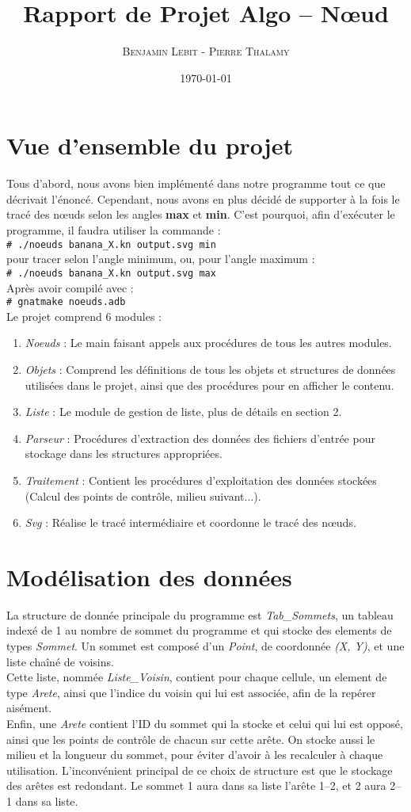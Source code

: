 \documentclass[12pt]{article}
\title{Rapport de Projet Algo -- Nœud}
\author{\textsc{Benjamin Lebit} - \textsc{Pierre Thalamy}}
\date{\today}
\newcommand{\shellcmd}[1]{\\\indent\indent\texttt{\footnotesize\# #1}\\}
\begin{document}
\maketitle

\section {Vue d'ensemble du projet}
Tous d'abord, nous avons bien implémenté dans notre programme tout ce
que décrivait l'énoncé. Cependant, nous avons en plus décidé de supporter à la
fois le tracé des nœuds selon les angles \textbf{max} et \textbf{min}. C'est pourquoi, afin
d'exécuter le programme, il faudra utiliser la commande :
\shellcmd{./noeuds banana\_X.kn output.svg min} 
pour tracer selon l'angle minimum, ou, pour l'angle maximum :
\shellcmd{./noeuds banana\_X.kn output.svg max} 
Après avoir compilé avec :
\shellcmd{gnatmake noeuds.adb} 

Le projet comprend 6 modules :
\begin{enumerate}
\item \emph{Noeuds} : Le main faisant appels aux procédures de tous
  les autres modules. 
\item \emph{Objets} : Comprend les définitions de tous les objets et
  structures de données utilisées dans le projet, ainsi que des
  procédures pour en afficher le contenu.
\item \emph{Liste} : Le module de gestion de liste, plus de détails en
  section 2.
\item \emph{Parseur} : Procédures d'extraction des données des fichiers
  d'entrée pour stockage dans les structures appropriées.
\item \emph{Traitement} : Contient les procédures d'exploitation des
  données stockées (Calcul des points de contrôle, milieu
  suivant...).
\item \emph{Svg} : Réalise le tracé intermédiaire et coordonne le tracé des nœuds.
\end{enumerate}

\section {Modélisation des données}
La structure de donnée principale du programme est \emph{Tab\_Sommets},
un tableau indexé de 1 au nombre de sommet du programme et qui stocke
des elements de types \emph{Sommet}. Un sommet est composé d'un \emph{Point}, de
coordonnée \emph{(X, Y)}, et une liste chaîné de voisins. \\
Cette liste, nommée \emph{Liste\_Voisin}, contient pour chaque cellule,
un element de type \emph{Arete}, ainsi que l'indice du voisin qui lui
est associée, afin de la repérer aisément. \\
Enfin, une \emph{Arete} contient l'ID du sommet qui la stocke et celui
qui lui est opposé, ainsi que les points de contrôle de chacun sur
cette arête. On stocke aussi le milieu et la longueur du sommet, pour
éviter d'avoir à les recalculer à chaque utilisation. L'inconvénient
principal de ce choix de structure est que le stockage des arêtes est
redondant. Le sommet 1 aura dans sa liste l'arête 1--2, et 2 aura
2--1 dans sa liste.
\end{document}
